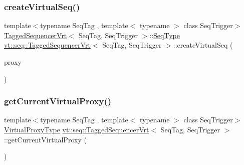 \subsubsection{\texorpdfstring{create\+Virtual\+Seq()}{createVirtualSeq()}}
{\footnotesize\ttfamily template$<$typename Seq\+Tag , template$<$ typename $>$ class Seq\+Trigger$>$ \\
\hyperlink{structvt_1_1seq_1_1_tagged_sequencer_vrt}{Tagged\+Sequencer\+Vrt}$<$ Seq\+Tag, Seq\+Trigger $>$\+::\hyperlink{structvt_1_1seq_1_1_tagged_sequencer_a1c8ee839258d0f88c49ef660267a81d5}{Seq\+Type} \hyperlink{structvt_1_1seq_1_1_tagged_sequencer_vrt}{vt\+::seq\+::\+Tagged\+Sequencer\+Vrt}$<$ Seq\+Tag, Seq\+Trigger $>$\+::create\+Virtual\+Seq (\begin{DoxyParamCaption}\item[{\hyperlink{namespacevt_a1b417dd5d684f045bb58a0ede70045ac}{Virtual\+Proxy\+Type} const \&}]{proxy }\end{DoxyParamCaption})}

\mbox{\label{structvt_1_1seq_1_1_tagged_sequencer_vrt_ab022ac29916fd6b9df9161567cbbd910}} 
\subsubsection{\texorpdfstring{get\+Current\+Virtual\+Proxy()}{getCurrentVirtualProxy()}}
{\footnotesize\ttfamily template$<$typename Seq\+Tag , template$<$ typename $>$ class Seq\+Trigger$>$ \\
\hyperlink{namespacevt_a1b417dd5d684f045bb58a0ede70045ac}{Virtual\+Proxy\+Type} \hyperlink{structvt_1_1seq_1_1_tagged_sequencer_vrt}{vt\+::seq\+::\+Tagged\+Sequencer\+Vrt}$<$ Seq\+Tag, Seq\+Trigger $>$\+::get\+Current\+Virtual\+Proxy (\begin{DoxyParamCaption}{ }\end{DoxyParamCaption})}

\mbox{\label{structvt_1_1seq_1_1_tagged_sequencer_vrt_a2dff0d8c70573a608c199b81657a19cb}} 
